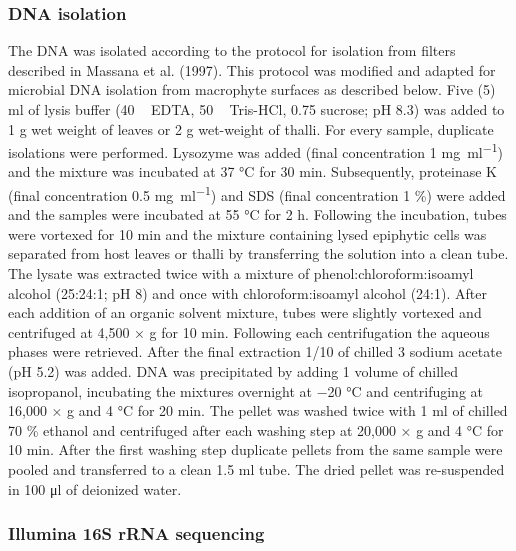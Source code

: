 \documentclass[12pt,]{article}
\begin{document}
\hypertarget{dna-isolation}{%
\subsubsection{DNA isolation}\label{dna-isolation}}

The DNA was isolated according to the protocol for isolation from
filters described in Massana et al. (1997). This protocol was modified
and adapted for microbial DNA isolation from macrophyte surfaces as
described below. Five (5) \si{\ml} of lysis buffer (40 \si{\milli\Molar}
EDTA, 50 \si{\milli\Molar} Tris-HCl, 0.75 \si{\Molar} sucrose; pH 8.3)
was added to 1 \si{\g} wet weight of leaves or 2 \si{\g} wet-weight of
thalli. For every sample, duplicate isolations were performed. Lysozyme
was added (final concentration 1 \si{\mg\per\ml}) and the mixture was
incubated at 37 \si{\degreeCelsius} for 30 \si{\minute}. Subsequently,
proteinase K (final concentration 0.5 \si{\mg\per\ml}) and SDS (final
concentration 1 \si{\percent}) were added and the samples were incubated
at 55 \si{\degreeCelsius} for 2 \si{\hour}. Following the incubation,
tubes were vortexed for 10 \si{\minute} and the mixture containing lysed
epiphytic cells was separated from host leaves or thalli by transferring
the solution into a clean tube. The lysate was extracted twice with a
mixture of phenol:chloroform:isoamyl alcohol (25:24:1; pH 8) and once
with chloroform:isoamyl alcohol (24:1). After each addition of an
organic solvent mixture, tubes were slightly vortexed and centrifuged at
4,500 × g for 10 \si{\minute}. Following each centrifugation the aqueous
phases were retrieved. After the final extraction 1/10 of chilled 3
\si{\Molar} sodium acetate (pH 5.2) was added. DNA was precipitated by
adding 1 volume of chilled isopropanol, incubating the mixtures
overnight at \num{-20} \si{\degreeCelsius} and centrifuging at 16,000 ×
g and 4 \si{\degreeCelsius} for 20 \si{\minute}. The pellet was washed
twice with 1 \si{\ml} of chilled 70 \si{\percent} ethanol and
centrifuged after each washing step at 20,000 × g and 4
\si{\degreeCelsius} for 10 \si{\minute}. After the first washing step
duplicate pellets from the same sample were pooled and transferred to a
clean 1.5 \si{\ml} tube. The dried pellet was re-suspended in 100
\si{\ul} of deionized water.

\hypertarget{illumina-16s-rrna-sequencing}{%
\subsubsection{Illumina 16S rRNA
sequencing}\label{illumina-16s-rrna-sequencing}}
\end{document}
